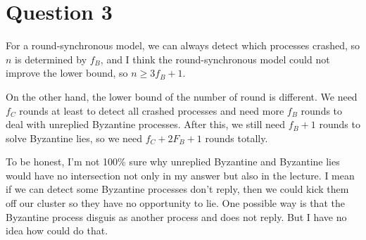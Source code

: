 \documentclass{article}
\begin{document}
\section*{Question 3}
For a round-synchronous model, we can always detect which processes crashed, so $n$ is determined by $f_B$, and I think the round-synchronous model could not improve the lower bound, so $n \geq 3f_B+1$.

On the other hand, the lower bound of the number of round is different. We need $f_C$ rounds at least to detect all crashed processes and need more $f_B$ rounds to deal with unreplied Byzantine processes. After this, we still need $f_B+1$ rounds to solve Byzantine lies, so we need $f_C+2F_B+1$ rounds totally.

To be honest, I'm not 100\% sure why unreplied Byzantine and Byzantine lies would have no intersection not only in my answer but also in the lecture. I mean if we can detect some Byzantine processes don't reply, then we could kick them off our cluster so they have no opportunity to lie. One possible way is that the Byzantine process disguis as another process and does not reply. But I have no idea how could do that.
\end{document}
